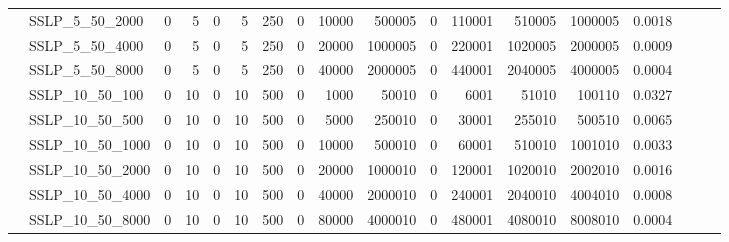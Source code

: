 \begin{table}[h]
{\begin{tabular}{llrrrrrrrrrrrrrlll}
			& SSLP\_5\_50\_2000            & 0            & 5           & 0          & 5            & 250         & 0          & 10000   & 500005   & 0      & 110001  & 510005   & 1000005    & 0.0018    &                          &                          &                          \\
			& SSLP\_5\_50\_4000            & 0            & 5           & 0          & 5            & 250         & 0          & 20000   & 1000005  & 0      & 220001  & 1020005  & 2000005    & 0.0009    &                          &                          &                          \\
			& SSLP\_5\_50\_8000            & 0            & 5           & 0          & 5            & 250         & 0          & 40000   & 2000005  & 0      & 440001  & 2040005  & 4000005    & 0.0004    &                          &                          &                          \\
			& SSLP\_10\_50\_100            & 0            & 10          & 0          & 10           & 500         & 0          & 1000    & 50010    & 0      & 6001    & 51010    & 100110     & 0.0327    &                          &                          &                          \\
			& SSLP\_10\_50\_500            & 0            & 10          & 0          & 10           & 500         & 0          & 5000    & 250010   & 0      & 30001   & 255010   & 500510     & 0.0065    &                          &                          &                          \\
			& SSLP\_10\_50\_1000           & 0            & 10          & 0          & 10           & 500         & 0          & 10000   & 500010   & 0      & 60001   & 510010   & 1001010    & 0.0033    &                          &                          &                          \\
			& SSLP\_10\_50\_2000           & 0            & 10          & 0          & 10           & 500         & 0          & 20000   & 1000010  & 0      & 120001  & 1020010  & 2002010    & 0.0016    &                          &                          &                          \\
			& SSLP\_10\_50\_4000           & 0            & 10          & 0          & 10           & 500         & 0          & 40000   & 2000010  & 0      & 240001  & 2040010  & 4004010    & 0.0008    &                          &                          &                          \\
			& SSLP\_10\_50\_8000           & 0            & 10          & 0          & 10           & 500         & 0          & 80000   & 4000010  & 0      & 480001  & 4080010  & 8008010    & 0.0004    &                          &                          &                          \\

\end{tabular}}
\end{table}
